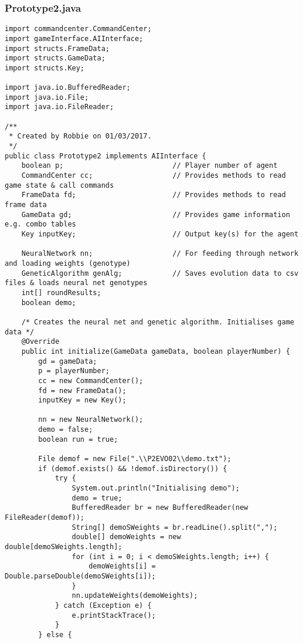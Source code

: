\documentclass[12pt,a4paper]{article}
\begin{document}
\subsubsection{Prototype2.java}
\begin{lstlisting}
import commandcenter.CommandCenter;
import gameInterface.AIInterface;
import structs.FrameData;
import structs.GameData;
import structs.Key;

import java.io.BufferedReader;
import java.io.File;
import java.io.FileReader;

/**
 * Created by Robbie on 01/03/2017.
 */
public class Prototype2 implements AIInterface {
    boolean p;                          // Player number of agent
    CommandCenter cc;                   // Provides methods to read game state & call commands
    FrameData fd;                       // Provides methods to read frame data
    GameData gd;                        // Provides game information e.g. combo tables
    Key inputKey;                       // Output key(s) for the agent

    NeuralNetwork nn;                   // For feeding through network and loading weights (genotype)
    GeneticAlgorithm genAlg;            // Saves evolution data to csv files & loads neural net genotypes
    int[] roundResults;
    boolean demo;

    /* Creates the neural net and genetic algorithm. Initialises game data */
    @Override
    public int initialize(GameData gameData, boolean playerNumber) {
        gd = gameData;
        p = playerNumber;
        cc = new CommandCenter();
        fd = new FrameData();
        inputKey = new Key();

        nn = new NeuralNetwork();
        demo = false;
        boolean run = true;

        File demof = new File(".\\P2EVO02\\demo.txt");
        if (demof.exists() && !demof.isDirectory()) {
            try {
                System.out.println("Initialising demo");
                demo = true;
                BufferedReader br = new BufferedReader(new FileReader(demof));
                String[] demoSWeights = br.readLine().split(",");
                double[] demoWeights = new double[demoSWeights.length];
                for (int i = 0; i < demoSWeights.length; i++) {
                    demoWeights[i] = Double.parseDouble(demoSWeights[i]);
                }
                nn.updateWeights(demoWeights);
            } catch (Exception e) {
                e.printStackTrace();
            }
        } else {


\end{lstlisting}
\end{document}
